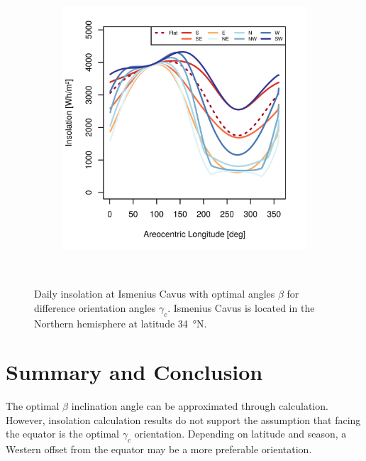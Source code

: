 \begin{figure}[h]
\begin{subfigure}[t]{\subfigureWidth}
            \includegraphics[height=\graphicsHeight]{sections/appendix/optimal-angles/plots/ismenius-cavus-tau-04-and-beta-optimal-based-on-solar-insolation.png}
            \label{fig:sub:optimal-angles-ismenius-cavus-based-on-insolation}
    \end{subfigure}\\[0.8ex]
    \caption[Daily insolation at Ismenius Cavus with optimal angles $\beta$ for difference orientation angles $\gamma_c$]
    {Daily insolation at Ismenius Cavus with optimal angles $\beta$ for difference orientation angles $\gamma_c$. Ismenius Cavus is located in the Northern hemisphere at latitude \SI{34}{\degree}N.}
    \label{fig:plot:optimal-angles-ismenius-cavus}
\vspace{-2ex}
\end{figure}

\section{Summary and Conclusion}
The optimal $\beta$ inclination angle can be approximated through calculation. However, insolation calculation results do not support the assumption that facing the equator is the optimal $\gamma_c$ orientation. Depending on latitude and season, a Western offset from the equator may be a more preferable orientation.
